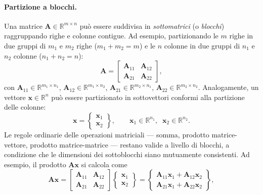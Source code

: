 \paragraph{Partizione a blocchi.}
Una matrice $\bm{A} \in \mathbb{R}^{m \times n}$ pu\`o essere suddivisa in \textit{sottomatrici} (o \textit{blocchi}) raggruppando righe e colonne contigue. Ad esempio, partizionando le $m$ righe in due gruppi di $m_1$ e $m_2$ righe ($m_1+m_2=m$) e le $n$ colonne in due gruppi di $n_1$ e $n_2$ colonne ($n_1+n_2=n$):
\begin{equation}
	\bm{A} = \left[\begin{array}{c|c}
		\bm{A}_{11} & \bm{A}_{12} \\ \hline
		\bm{A}_{21} & \bm{A}_{22}
	\end{array}\right],
\end{equation}
con $\bm{A}_{11} \in \mathbb{R}^{m_1 \times n_1}$, $\bm{A}_{12} \in \mathbb{R}^{m_1 \times n_2}$, $\bm{A}_{21} \in \mathbb{R}^{m_2 \times n_1}$, $\bm{A}_{22} \in \mathbb{R}^{m_2 \times n_2}$. Analogamente, un vettore $\bm{x} \in \mathbb{R}^n$ pu\`o essere partizionato in sottovettori conformi alla partizione delle colonne:
\begin{equation}
	\bm{x} = \left\{\begin{array}{c} \bm{x}_1 \\ \hline \bm{x}_2 \end{array}\right\},
	\qquad \bm{x}_1 \in \mathbb{R}^{n_1},\;\; \bm{x}_2 \in \mathbb{R}^{n_2}.
\end{equation}
Le regole ordinarie delle operazioni matriciali --- somma, prodotto matrice-vettore, prodotto matrice-matrice --- restano valide a livello di blocchi, a condizione che le dimensioni dei sottoblocchi siano mutuamente consistenti. Ad esempio, il prodotto $\bm{A}\bm{x}$ si calcola come
\begin{equation}
	\bm{A}\bm{x} =
	\left[\begin{array}{c|c}
		\bm{A}_{11} & \bm{A}_{12} \\ \hline
		\bm{A}_{21} & \bm{A}_{22}
	\end{array}\right]
	\left\{\begin{array}{c} \bm{x}_1 \\ \hline \bm{x}_2 \end{array}\right\}
	= \left\{\begin{array}{c}
		\bm{A}_{11}\bm{x}_1 + \bm{A}_{12}\bm{x}_2 \\ \hline
		\bm{A}_{21}\bm{x}_1 + \bm{A}_{22}\bm{x}_2
	\end{array}\right\},
\end{equation}
